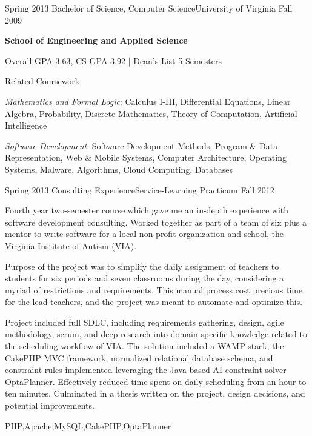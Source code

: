 \begin{scholarship}
  \experience
    {Spring 2013}   {Bachelor of Science, Computer Science}{University of Virginia}
    {Fall 2009} 
                    {
                        \textbf{School of Engineering and Applied Science}

                        Overall GPA 3.63, CS GPA 3.92 | Dean's List 5 Semesters 

                        \textcolor{accentcolor}{Related Coursework}

                        \textit{Mathematics and Formal Logic}: Calculus I-III, Differential Equations, Linear Algebra, Probability, Discrete Mathematics, Theory of Computation, Artificial Intelligence

                        \textit{Software Development}: Software Development Methods, Program \& Data Representation, Web \& Mobile Systems, Computer Architecture, Operating Systems, Malware, Algorithms, Cloud Computing, Databases
                    }
                    {}
  \experience
    {Spring 2013}  {Consulting Experience}{Service-Learning Practicum}
    {Fall 2012}    {
                        Fourth year two-semester course which gave me an in-depth experience with software development consulting. Worked together as part of a team of six plus a mentor to write software for a local non-profit organization and school, the Virginia Institute of Autism (VIA).

                        \vspace{0.5em}

                        Purpose of the project was to simplify the daily assignment of teachers to students for six periods and seven classrooms during the day, considering a myriad of restrictions and requirements. This manual process cost precious time for the lead teachers, and the project was meant to automate and optimize this.

                        \vspace{0.5em}

                        Project included full SDLC, including requirements gathering, design, agile methodology, scrum, and deep research into domain-specific knowledge related to the scheduling workflow of VIA. The solution included a WAMP stack, the CakePHP MVC framework, normalized relational database schema, and constraint rules implemented leveraging the Java-based AI constraint solver OptaPlanner. Effectively reduced time spent on daily scheduling from an hour to ten minutes. Culminated in a thesis written on the project, design decisions, and potential improvements.
                    }
                    {PHP,Apache,MySQL,CakePHP,OptaPlanner}
\end{scholarship}
\filbreak